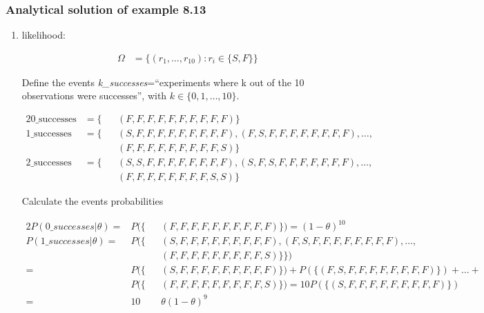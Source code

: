 \begin{frame}
    \frametitle{Analytical solution of example 8.13}

    \tiny
	\begin{enumerate}[a]
        \conti
		\item likelihood:

			\begin{align*}
				\Omega&=\{(r_1,\ldots,r_{10}):r_i\in\{S,F\}\}
			\end{align*}

			Define the events \textit{k\_successes}=``experiments where k out of the 10 observations were successes'', with $k\in\{0,1,\ldots,10\}$.

            \begin{alignat*}{2}
                \text{0\_successes}&=\{&&(F,F,F,F,F,F,F,F,F,F)\}\\
                \text{1\_successes}&=\{&&(S,F,F,F,F,F,F,F,F,F),(F,S,F,F,F,F,F,F,F,F),\ldots,\\
                                   &   &&(F,F,F,F,F,F,F,F,F,S)\}\\
                \text{2\_successes}&=\{&&(S,S,F,F,F,F,F,F,F,F),(S,F,S,F,F,F,F,F,F,F),\ldots,\\
                                   &   &&(F,F,F,F,F,F,F,F,S,S)\}
            \end{alignat*}

            Calculate the events probabilities

			\begin{alignat*}{2}
				P(0\_successes|\theta)=&P(\{&&(F,F,F,F,F,F,F,F,F,F)\})=(1-\theta)^{10}\\
				P(1\_successes|\theta)=&P(\{&&(S,F,F,F,F,F,F,F,F,F),(F,S,F,F,F,F,F,F,F,F),\ldots,\\
                                      &    &&(F,F,F,F,F,F,F,F,F,S)\}\})\\
                                     =&P(\{&&(S,F,F,F,F,F,F,F,F,F)\})+P(\{(F,S,F,F,F,F,F,F,F,F)\})+\ldots+\\
                                      &P(\{&&(F,F,F,F,F,F,F,F,F,S)\})=10P(\{(S,F,F,F,F,F,F,F,F,F)\})\\
                                     =&10&&\theta(1-\theta)^9
			\end{alignat*}

	\end{enumerate}
\end{frame}

